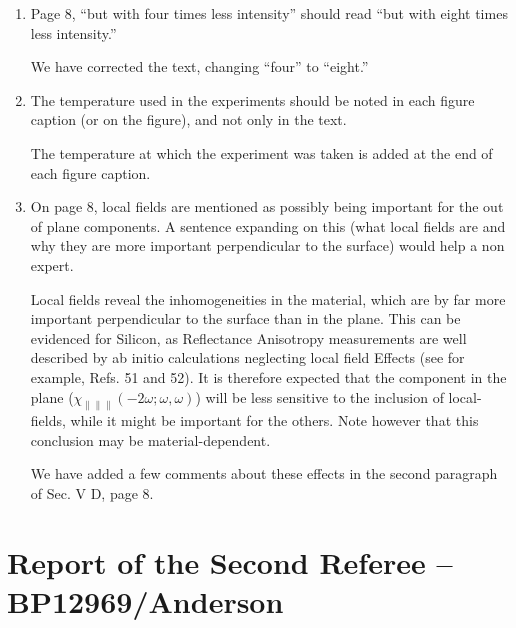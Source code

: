 \documentclass[11pt]{article}
\begin{document}
\begin{enumerate}
\item
Page 8, ``but with four times less intensity'' should read ``but with eight
times less intensity.''
\begin{shaded}\label{ref1.10}
We have corrected the text, changing ``four'' to ``eight.''
\end{shaded}

\item
The temperature used in the experiments should be noted in each figure caption
(or on the figure), and not only in the text.
\begin{shaded}\label{ref1.11}
The temperature at which the experiment was taken is added at the end of each
figure caption.
\end{shaded}

\item
On page 8, local fields are mentioned as possibly being important for the out of
plane components. A sentence expanding on this (what local fields are and why
they are more important perpendicular to the surface) would help a non expert.
\begin{shaded}\label{ref1.12}
Local fields reveal the inhomogeneities in the material, which are by far more
important perpendicular to the surface than in the plane. This can be evidenced
for Silicon, as Reflectance Anisotropy measurements are well described by ab
initio calculations neglecting local field Effects (see for example, Refs. 51
and 52). It is therefore expected that the component in the plane
($\chi_{\parallel\parallel\parallel}(-2\omega;\omega,\omega)$) will be less
sensitive to the inclusion of local-fields, while it might be important for the
others. Note however that this conclusion may be material-dependent.

We have added a few comments about these effects in the second paragraph of Sec.
V D, page 8.
\end{shaded}

\end{enumerate}



\section{Report of the Second Referee -- BP12969/Anderson}
\end{document}
